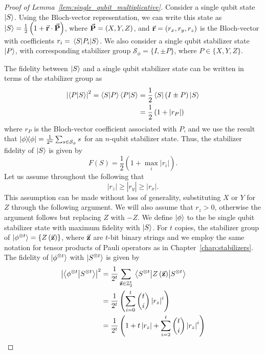 \begin{proof}[Proof of Lemma~\ref{lem:single_qubit_multiplicative}]

Consider a single qubit state $\ket{S}$. Using the Bloch-vector representation, we can write this state as $\ket{S}=\frac{1}{2}\left(1+\va{r}\cdot\va{P}\right)$, where $\va{P}=\left(X,Y,Z\right)$, and $\va{r}=\left(r_{x},r_{y},r_{z}\right)$ is the Bloch-vector with coefficients $r_{i}=\matrixel{S}{P_{i}}{S}$.
We also consider a single qubit stabilizer state $\ket{P}$, with corresponding stabilizer group $\mathcal{S}_{\phi}=\{I, \pm P\}$, where $P\in \{X, Y, Z\}$.\par
The fidelity between $\ket{S}$ and a single qubit stabilizer state can be written in terms of the stabilizer group as
\begin{align*}
\left|\braket{P}{S}\right|^{2}=\braket{S}{P}\braket{P}{S}&=\frac{1}{2} \bra{S}\left(I \pm P\right)\ket{S}\\
&=\frac{1}{2}\left(1+\left|r_{P}\right|\right)
\end{align*}
where $r_{P}$ is the Bloch-vector coefficient associated with $P$, and we use the result that $\ketbra{\phi}=\frac{1}{2^{n}}\sum_{s\in\mathcal{S}_{\phi}}s$ for an $n$-qubit stabilizer state. Thus, the stabilizer fidelity of $\ket{S}$ is given by 
\[F(S)=\frac{1}{2}\left(1+\max_{i}\left|r_{i}\right|\right).\]
Let us assume throughout the following that 
\[\left|r_{z}\right| \geq \left|r_{y}\right| \geq \left|r_{x}\right|.\]
This assumption can be made without loss of generality, substituting $X$ or $Y$ for $Z$ through the following argument. We will also assume that $r_{z}>0$, otherwise the argument follows but replacing $Z$ with $-Z$. We define $\ket{\phi}$ to the be single qubit stabilizer state with maximum fidelity with $\ket{S}$.
For $t$ copies, the stabilizer group of $\ket{\phi^{\otimes t}}=\{Z\left(\va{z}\right)\}$, where $\va{z}$ are $t$-bit binary strings and we employ the same notation for tensor products of Pauli operators as in Chapter~\ref{chap:stabilizers}. The fidelity of $\ket{\phi^{\otimes t}}$ with $\ket{S^{\otimes t}}$ is given by
\begin{align}
\left|\braket{\phi^{\otimes t}}{S^{\otimes t}}\right|^{2} &= \frac{1}{2^{t}}\sum_{\va{z}\in\mathbb{Z}_{2}^{t}}\matrixel{S^{\otimes t}}{Z\left(\va{z}\right)}{S^{\otimes t}}\nonumber\\
&= \frac{1}{2^{t}}\left(\sum_{i=0}^{t}\binom{t}{i}\left|r_{z}\right|^{i}\right) \nonumber\\&=
\frac{1}{2^{t}} \left( 1+t\left|r_{z}\right| + \sum_{i=2}^{t}\binom{t}{i}\left|r_{z}\right|^{i} \right)

\end{align}
\end{proof}
